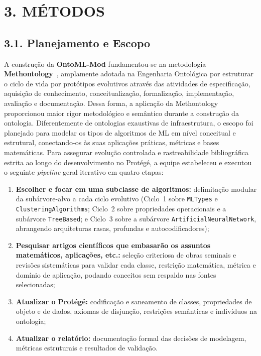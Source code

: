 \documentclass[11pt,a4paper]{article}
\newcommand{\onto}[1]{\texttt{\small #1}}
\begin{document}
\section{3. MÉTODOS}

\subsection{3.1. Planejamento e Escopo}

A construção da \textbf{OntoML-Mod} fundamentou-se na metodologia \textbf{Methontology}~\cite{fernandez1997methontology}, amplamente adotada na Engenharia Ontológica por estruturar o ciclo de vida por protótipos evolutivos através das atividades de especificação, aquisição de conhecimento, conceitualização, formalização, implementação, avaliação e documentação. Dessa forma, a aplicação da Methontology proporcionou maior rigor metodológico e semântico durante a construção da ontologia. Diferentemente de ontologias exaustivas de infraestrutura, o escopo foi planejado para modelar os tipos de algoritmos de ML em nível conceitual e estrutural, conectando-os às suas aplicações práticas, métricas e bases matemáticas. Para assegurar evolução controlada e rastreabilidade bibliográfica estrita ao longo do desenvolvimento no Protégé, a equipe estabeleceu e executou o seguinte \emph{pipeline} geral iterativo em quatro etapas:
\begin{enumerate}[leftmargin=*,nosep]
  \item \textbf{Escolher e focar em uma subclasse de algoritmos:} delimitação modular da subárvore-alvo a cada ciclo evolutivo (Ciclo~1 sobre \onto{MLTypes} e \onto{ClusteringAlgorithms}; Ciclo~2 sobre propriedades operacionais e a subárvore \onto{TreeBased}; e Ciclo~3 sobre a subárvore \onto{ArtificialNeuralNetwork}, abrangendo arquiteturas rasas, profundas e autocodificadores);
  \item \textbf{Pesquisar artigos científicos que embasarão os assuntos matemáticos, aplicações, etc.:} seleção criteriosa de obras seminais e revisões sistemáticas para validar cada classe, restrição matemática, métrica e domínio de aplicação, podando conceitos sem respaldo nas fontes selecionadas;
  \item \textbf{Atualizar o Protégé:} codificação e saneamento de classes, propriedades de objeto e de dados, axiomas de disjunção, restrições semânticas e indivíduos na ontologia;
  \item \textbf{Atualizar o relatório:} documentação formal das decisões de modelagem, métricas estruturais e resultados de validação.
\end{enumerate}
\end{document}
